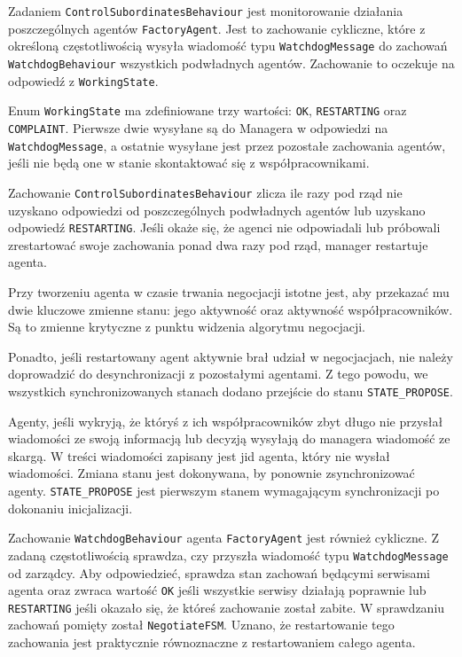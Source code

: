 Zadaniem \texttt{ControlSubordinatesBehaviour} jest monitorowanie działania poszczególnych agentów \texttt{FactoryAgent}. Jest to zachowanie cykliczne, które z określoną częstotliwością wysyła wiadomość typu \texttt{WatchdogMessage} do zachowań \texttt{WatchdogBehaviour} wszystkich podwładnych agentów. Zachowanie to oczekuje na odpowiedź z \texttt{WorkingState}. 

Enum \texttt{WorkingState} ma zdefiniowane trzy wartości: \texttt{OK}, \texttt{RESTARTING} oraz \texttt{COMPLAINT}. Pierwsze dwie wysyłane są do Managera w odpowiedzi na \texttt{WatchdogMessage}, a ostatnie wysyłane jest przez pozostałe zachowania agentów, jeśli nie będą one w stanie skontaktować się z współpracownikami.

Zachowanie \texttt{ControlSubordinatesBehaviour} zlicza ile razy pod rząd nie uzyskano odpowiedzi od poszczególnych podwładnych agentów lub uzyskano odpowiedź \texttt{RESTARTING}. Jeśli okaże się, że agenci nie odpowiadali lub próbowali zrestartować swoje zachowania ponad dwa razy pod rząd, manager restartuje agenta. 

Przy tworzeniu agenta w czasie trwania negocjacji istotne jest, aby przekazać mu dwie kluczowe zmienne stanu: jego aktywność oraz aktywność współpracowników. Są to zmienne krytyczne z punktu widzenia algorytmu negocjacji. 

Ponadto, jeśli restartowany agent aktywnie brał udział w negocjacjach, nie należy doprowadzić do desynchronizacji z pozostałymi agentami. Z tego powodu, we wszystkich synchronizowanych stanach dodano przejście do stanu \texttt{STATE\_PROPOSE}. 

Agenty, jeśli wykryją, że któryś z ich współpracowników zbyt długo nie przysłał wiadomości ze swoją informacją lub decyzją wysyłają do managera wiadomość ze skargą. W treści wiadomości zapisany jest jid agenta, który nie wysłał wiadomości. Zmiana stanu jest dokonywana, by ponownie zsynchronizować agenty. \texttt{STATE\_PROPOSE} jest pierwszym stanem wymagającym synchronizacji po dokonaniu inicjalizacji.

Zachowanie \texttt{WatchdogBehaviour} agenta \texttt{FactoryAgent} jest również cykliczne. Z zadaną częstotliwością sprawdza, czy przyszła wiadomość typu \texttt{WatchdogMessage} od zarządcy. Aby odpowiedzieć, sprawdza stan zachowań będącymi serwisami agenta oraz zwraca wartość \texttt{OK} jeśli wszystkie serwisy działają poprawnie lub \texttt{RESTARTING} jeśli okazało się, że któreś zachowanie został zabite. W sprawdzaniu zachowań pomięty został \texttt{NegotiateFSM}. Uznano, że restartowanie tego zachowania jest praktycznie równoznaczne z restartowaniem całego agenta.





